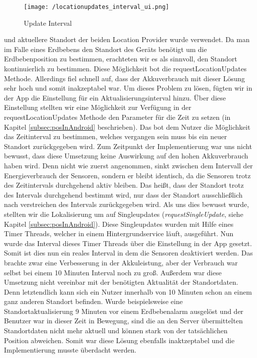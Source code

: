 \begin{wrapfigure}{r}{50mm}
\centering
   \texttt{[image: /locationupdates\_interval\_ui.png]} 
   \caption[Lokalisierung: Update Interval]{Update Interval}
\end{wrapfigure}

und aktuellere Standort der beiden Location Provider wurde verwendet. Da man im Falle eines Erdbebens den Standort des Geräts benötigt um die Erdbebenposition zu bestimmen, erachteten wir es als sinnvoll, den Standort kontinuierlich zu bestimmen. Diese Möglichkeit bot die requestLocationUpdates Methode. Allerdings fiel schnell auf, dass der Akkuverbrauch mit dieser Lösung sehr hoch und somit inakzeptabel war. Um dieses Problem zu lösen, fügten wir in der App die Einstellung für ein Aktualisierungsinterval hinzu. Über diese Einstellung stellten wir eine Möglichkeit zur Verfügung in der requestLocationUpdates Methode den Parameter für die Zeit zu setzen (in Kapitel \ref{subsec:posInAndroid} beschrieben). Das bot dem Nutzer die Möglichkeit das Zeitinterval zu bestimmen, welches vergangen sein muss bis ein neuer Standort zurückgegeben wird. Zum Zeitpunkt der Implementierung war uns nicht bewusst, dass diese Umsetzung keine Auswirkung auf den hohen Akkuverbrauch haben wird. Denn nicht wie zuerst angenommen, sinkt zwischen dem Intervall der Energieverbrauch der Sensoren, sondern er bleibt identisch, da die Sensoren trotz des Zeitintervals durchgehend aktiv bleiben.
Das heißt, dass der Standort trotz des Intervals durchgehend bestimmt wird, nur dass der Standort ausschließlich nach verstreichen des Intervals zurückgegeben wird.
Als uns dies bewusst wurde, stellten wir die Lokalisierung um auf Singleupdates (\textit{requestSingleUpdate}, siehe Kapitel \ref{subsec:posInAndroid}). Diese Singleupdates wurden mit Hilfe eines Timer Threads, welcher in einem Hintergrundservice läuft, ausgeführt. Nun wurde das Interval dieses Timer Threads über die Einstellung in der App gesetzt. Somit ist dies nun ein reales Interval in dem die Sensoren deaktiviert werden. 
Das brachte zwar eine Verbesserung in der Akkuleistung, aber der Verbrauch war selbst bei einem 10 Minuten Interval noch zu groß. Außerdem war diese Umsetzung nicht vereinbar mit der benötigten Aktualität der Standortdaten. Denn letztendlich kann sich ein Nutzer innerhalb von 10 Minuten schon an einem ganz anderen Standort befinden. Wurde beispielsweise eine Standortaktualisierung 9 Minuten vor einem Erdbebenalarm ausgelöst und der Benutzer war in dieser Zeit in Bewegung, sind die an den Server übermittelten Standortdaten nicht mehr aktuell und können stark von der tatsächlichen Position abweichen. Somit war diese Lösung ebenfalls inaktzeptabel und die Implementierung musste überdacht werden.

